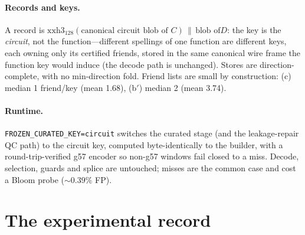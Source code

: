 \documentclass[11pt]{article}
\newcommand{\code}[1]{\texttt{#1}}
\begin{document}
\paragraph{Records and keys.} A record is
$\mathrm{xxh3}_{128}(\text{canonical circuit blob of } C)\,\|\,\text{blob of
} D$: the key is the \emph{circuit}, not the function---different spellings
of one function are different keys, each owning only its certified friends,
stored in the same canonical wire frame the function key would induce (the
decode path is unchanged). Stores are direction-complete, with no
min-direction fold. Friend lists are small by construction: (c) median 1
friend/key (mean 1.68), (b$'$) median 2 (mean 3.74).

\paragraph{Runtime.} \code{FROZEN\_CURATED\_KEY=circuit} switches the
curated stage (and the leakage-repair QC path) to the circuit key, computed
byte-identically to the builder, with a round-trip-verified g57 encoder so
non-g57 windows fail closed to a miss. Decode, selection, guards and splice
are untouched; misses are the common case and cost a Bloom probe
(${\sim}0.39\%$ FP).

\section{The experimental record}
\end{document}

